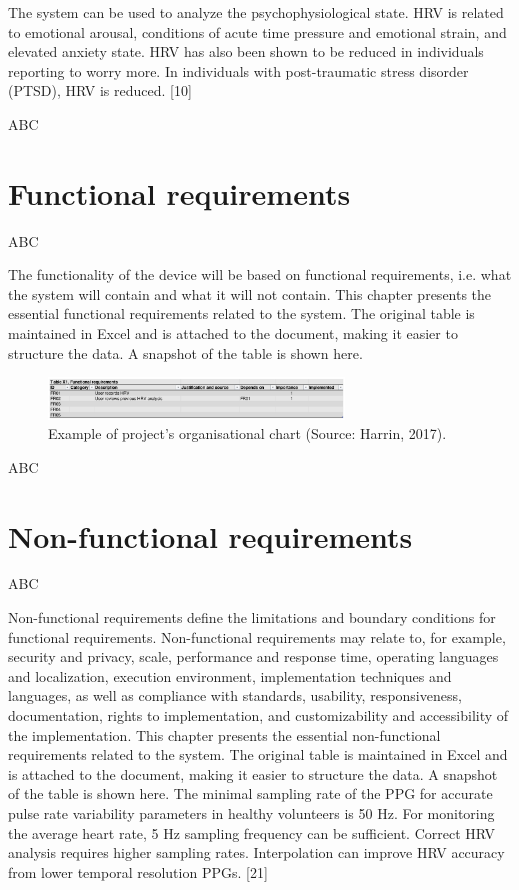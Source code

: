 \documentclass{article}
\begin{document}
The system can be used to analyze the psychophysiological state. HRV is related to
emotional arousal, conditions of acute time pressure and emotional strain, and elevated
anxiety state. HRV has also been shown to be reduced in individuals reporting to worry
more. In individuals with post-traumatic stress disorder (PTSD), HRV is reduced. [10]

ABC


\section{Functional requirements}

ABC

The functionality of the device will be based on functional requirements, i.e. what the system
will contain and what it will not contain. This chapter presents the essential functional
requirements related to the system.
The original table is maintained in Excel and is attached to the document, making it easier to
structure the data. A snapshot of the table is shown here.

\begin{figure}[h]
  \centering
  \includegraphics[width=0.7\textwidth]{screenshot.png}
  \caption{ Example of project's organisational chart (Source: Harrin, 2017).}
  \label{harrin}
\end{figure}

ABC


\section{Non-functional requirements}

ABC

Non-functional requirements define the limitations and boundary conditions for functional
requirements. Non-functional requirements may relate to, for example, security and privacy,
scale, performance and response time, operating languages and localization, execution
environment, implementation techniques and languages, as well as compliance with
standards, usability, responsiveness, documentation, rights to implementation, and
customizability and accessibility of the implementation.
This chapter presents the essential non-functional requirements related to the system.
The original table is maintained in Excel and is attached to the document, making it easier to
structure the data. A snapshot of the table is shown here.
The minimal sampling rate of the PPG for accurate pulse rate variability parameters in
healthy volunteers is 50 Hz. For monitoring the average heart rate, 5 Hz sampling frequency
can be sufficient. Correct HRV analysis requires higher sampling rates. Interpolation can
improve HRV accuracy from lower temporal resolution PPGs. [21]
\end{document}
